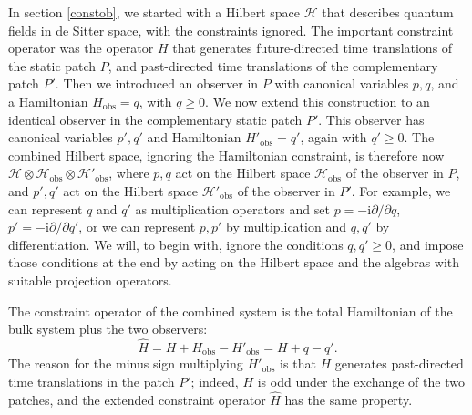 \documentclass[11pt,a4paper]{article}
\def\be{\begin{equation}}
\def\ee{\end{equation}}
\def\h{\widehat}
\def\h{\widehat}
\def\H{{\mathcal H}}
\def\obs{{\mathrm{obs}}}
\def\i{{\mathrm i}}
\begin{document}
In section \ref{constob}, we started with a Hilbert space $\H$ that describes quantum fields in de Sitter space, with the constraints ignored.  The important
constraint operator was the operator $H$ that generates future-directed time translations of the static patch $P$, and past-directed time translations of the complementary
patch $P'$.   Then we introduced an observer in $P$ with canonical
variables $p,q$, and a Hamiltonian $H_\obs=q$, with $q\geq 0$.        We  now extend this construction to  an identical observer in the complementary
static patch $P'$.    This observer has canonical variables $p',q'$ and Hamiltonian $H'_\obs=q'$, again with $q'\geq 0$.   The combined Hilbert space, ignoring
the Hamiltonian 
constraint, is therefore now $\H\otimes \H_\obs\otimes \H'_\obs$, where $p,q$ act on the Hilbert space $\H_\obs$ of the observer in $P$, and $p',q'$ act on the
Hilbert space $\H'_\obs$ of the observer in $P'$.   For example, we can represent $q$ and $q'$ as multiplication operators and set $p=-\i \partial/\partial q$,
$p'=-\i \partial/\partial q'$, or we can represent $p,p'$ by multiplication and $q,q'$ by differentiation.    We will, to begin with, ignore the conditions $q,q'\geq 0$,
and impose those conditions at the end by acting on the Hilbert space and the algebras with suitable projection operators.

The constraint operator of the combined system is the total Hamiltonian of the bulk system plus the two observers:
\be\label{totcon}\h H= H+H_\obs- H'_\obs=H+q-q'.\ee
The reason for the minus sign multiplying $H'_\obs$ is that $H$ generates past-directed time translations in the patch $P'$; indeed, $H$ is odd under the exchange
of the two patches, and the extended constraint operator $\h H$ has the same property.
\end{document}

